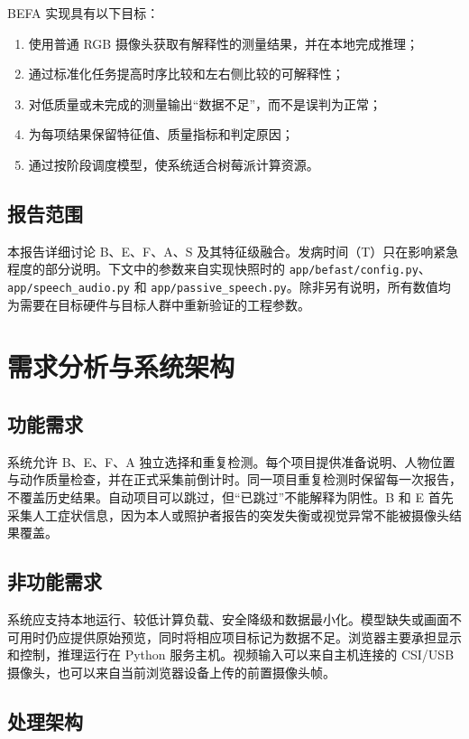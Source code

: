 \documentclass[11pt,a4paper]{article}
\begin{document}
BEFA 实现具有以下目标：

\begin{enumerate}
  \item 使用普通 RGB 摄像头获取有解释性的测量结果，并在本地完成推理；
  \item 通过标准化任务提高时序比较和左右侧比较的可解释性；
  \item 对低质量或未完成的测量输出“数据不足”，而不是误判为正常；
  \item 为每项结果保留特征值、质量指标和判定原因；
  \item 通过按阶段调度模型，使系统适合树莓派计算资源。
\end{enumerate}

\subsection{报告范围}

本报告详细讨论 B、E、F、A、S 及其特征级融合。发病时间（T）只在影响紧急程度的部分说明。下文中的参数来自实现快照时的 \texttt{app/befast/config.py}、\texttt{app/speech\_audio.py} 和 \texttt{app/passive\_speech.py}。除非另有说明，所有数值均为需要在目标硬件与目标人群中重新验证的工程参数。

\section{需求分析与系统架构}

\subsection{功能需求}

系统允许 B、E、F、A 独立选择和重复检测。每个项目提供准备说明、人物位置与动作质量检查，并在正式采集前倒计时。同一项目重复检测时保留每一次报告，不覆盖历史结果。自动项目可以跳过，但“已跳过”不能解释为阴性。B 和 E 首先采集人工症状信息，因为本人或照护者报告的突发失衡或视觉异常不能被摄像头结果覆盖。

\subsection{非功能需求}

系统应支持本地运行、较低计算负载、安全降级和数据最小化。模型缺失或画面不可用时仍应提供原始预览，同时将相应项目标记为数据不足。浏览器主要承担显示和控制，推理运行在 Python 服务主机。视频输入可以来自主机连接的 CSI/USB 摄像头，也可以来自当前浏览器设备上传的前置摄像头帧。

\subsection{处理架构}
\end{document}
